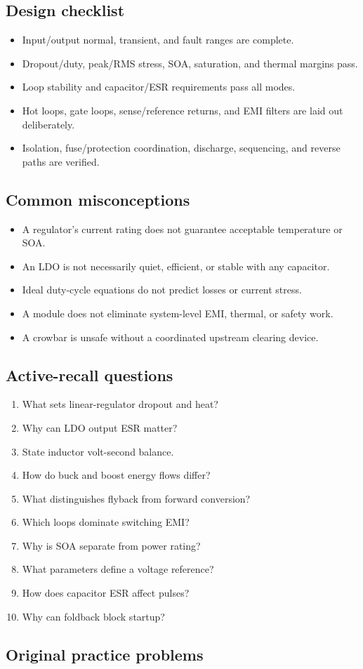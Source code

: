 \documentclass[10pt,letterpaper]{article}
\begin{document}
\subsection{Design checklist}
\begin{itemize}
  \item Input/output normal, transient, and fault ranges are complete.
  \item Dropout/duty, peak/RMS stress, SOA, saturation, and thermal margins pass.
  \item Loop stability and capacitor/ESR requirements pass all modes.
  \item Hot loops, gate loops, sense/reference returns, and EMI filters are laid out deliberately.
  \item Isolation, fuse/protection coordination, discharge, sequencing, and reverse paths are verified.
\end{itemize}\subsection{Common misconceptions}
\begin{itemize}
  \item A regulator's current rating does not guarantee acceptable temperature or SOA.
  \item An LDO is not necessarily quiet, efficient, or stable with any capacitor.
  \item Ideal duty-cycle equations do not predict losses or current stress.
  \item A module does not eliminate system-level EMI, thermal, or safety work.
  \item A crowbar is unsafe without a coordinated upstream clearing device.
\end{itemize}\subsection{Active-recall questions}
\begin{enumerate}
  \item What sets linear-regulator dropout and heat?
  \item Why can LDO output ESR matter?
  \item State inductor volt-second balance.
  \item How do buck and boost energy flows differ?
  \item What distinguishes flyback from forward conversion?
  \item Which loops dominate switching EMI?
  \item Why is SOA separate from power rating?
  \item What parameters define a voltage reference?
  \item How does capacitor ESR affect pulses?
  \item Why can foldback block startup?
\end{enumerate}\subsection{Original practice problems}
\end{document}
